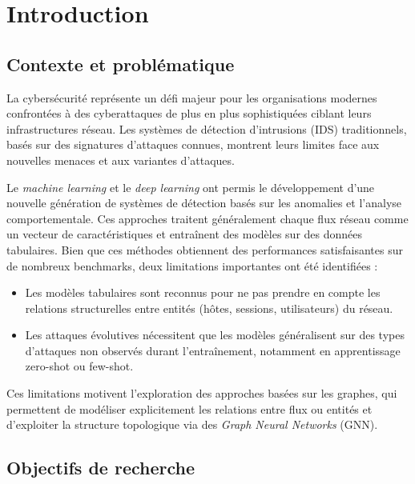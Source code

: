 ﻿\documentclass[11pt,a4paper]{article}
\begin{document}
\newpage
\tableofcontents
\newpage

\section{Introduction}

\subsection{Contexte et problématique}

La cybersécurité représente un défi majeur pour les organisations modernes confrontées à des cyberattaques de plus en plus sophistiquées ciblant leurs infrastructures réseau. Les systèmes de détection d'intrusions (IDS) traditionnels, basés sur des signatures d'attaques connues, montrent leurs limites face aux nouvelles menaces et aux variantes d'attaques.

Le \emph{machine learning} et le \emph{deep learning} ont permis le développement d'une nouvelle génération de systèmes de détection basés sur les anomalies et l'analyse comportementale. Ces approches traitent généralement chaque flux réseau comme un vecteur de caractéristiques et entraînent des modèles sur des données tabulaires. Bien que ces méthodes obtiennent des performances satisfaisantes sur de nombreux benchmarks, deux limitations importantes ont été identifiées :
\begin{itemize}
    \item Les modèles tabulaires sont reconnus pour ne pas prendre en compte les relations structurelles entre entités (hôtes, sessions, utilisateurs) du réseau.
    \item Les attaques évolutives nécessitent que les modèles généralisent sur des types d'attaques non observés durant l'entraînement, notamment en apprentissage zero-shot ou few-shot.
\end{itemize}

Ces limitations motivent l'exploration des approches basées sur les graphes, qui permettent de modéliser explicitement les relations entre flux ou entités et d'exploiter la structure topologique via des \emph{Graph Neural Networks} (GNN).

\subsection{Objectifs de recherche}
\end{document}

